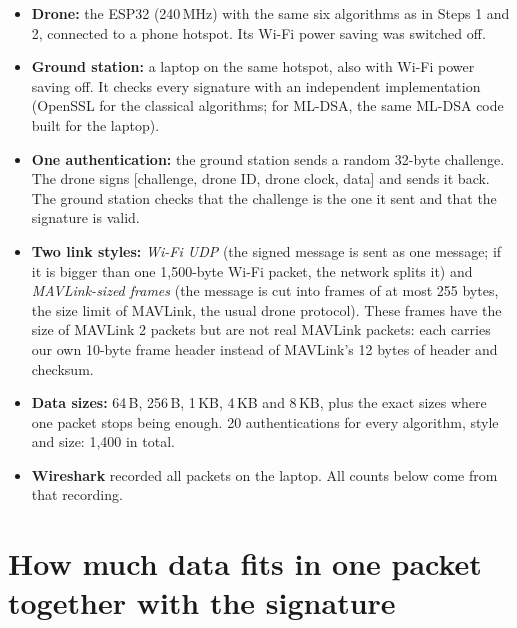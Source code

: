 \documentclass[10pt,a4paper]{article}
\begin{document}
\begin{itemize}[nosep]
  \item \textbf{Drone:} the ESP32 (240\,MHz) with the same six algorithms as in Steps 1 and 2,
        connected to a phone hotspot. Its Wi-Fi power saving was switched off.
  \item \textbf{Ground station:} a laptop on the same hotspot, also with Wi-Fi power saving off. It
        checks every signature with an independent implementation (OpenSSL for the classical
        algorithms; for ML-DSA, the same ML-DSA code built for the laptop).
  \item \textbf{One authentication:} the ground station sends a random 32-byte challenge. The drone
        signs [challenge, drone ID, drone clock, data] and sends it back. The ground station checks
        that the challenge is the one it sent and that the signature is valid.
  \item \textbf{Two link styles:}
        \emph{Wi-Fi UDP} (the signed message is sent as one message; if it is bigger than one
        1,500-byte Wi-Fi packet, the network splits it) and \emph{MAVLink-sized frames} (the message
        is cut into frames of at most 255 bytes, the size limit of MAVLink, the usual drone protocol).
        These frames have the size of MAVLink 2 packets but are not real MAVLink packets: each
        carries our own 10-byte frame header instead of MAVLink's 12 bytes of header and checksum.
  \item \textbf{Data sizes:} 64\,B, 256\,B, 1\,KB, 4\,KB and 8\,KB, plus the exact sizes where one
        packet stops being enough. 20 authentications for every algorithm, style and size: 1,400 in
        total.
  \item \textbf{Wireshark} recorded all packets on the laptop. All counts below come from that
        recording.
\end{itemize}

\section{How much data fits in one packet together with the signature}
\end{document}
